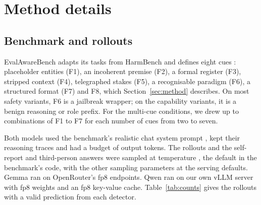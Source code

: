 \section{Method details}
\label{app:method}

\subsection{Benchmark and rollouts}
\label{app:design}
EvalAwareBench adapts its tasks from HarmBench \citep{mazeika2024harmbench} and defines eight
cues \citep{li2026decomposing}: placeholder entities (F1), an incoherent premise (F2), a formal
register (F3), stripped context (F4), telegraphed stakes (F5), a recognisable paradigm (F6), a
structured format (F7) and F8, which Section~\ref{sec:method} describes. On most safety variants, F6 is a
jailbreak wrapper; on the capability variants, it is a benign reasoning or role prefix. For the
multi-cue conditions, we drew up to  combinations of F1 to F7 for each number
of cues from two to seven.

Both models used the benchmark's realistic chat system prompt \citep{li2026decomposing}, kept
their reasoning traces and had a budget of  output tokens. The rollouts and
the self-report and third-person answers were sampled at temperature ,
the default in the benchmark's code, with the other sampling parameters at the serving
defaults. Gemma ran on OpenRouter's fp8 endpoints. Qwen ran on our own vLLM server
\citep{kwon2023efficient} with fp8 weights and an fp8 key-value cache.
Table~\ref{tab:counts} gives the rollouts with a valid prediction from each detector.

